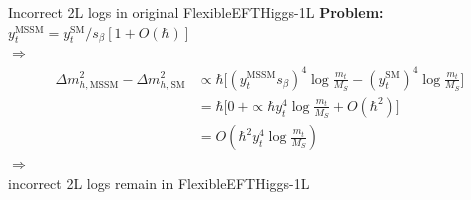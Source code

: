 \documentclass[hyperref={pdfpagelabels=false},ngerman]{beamer}
\renewcommand{\emph}{\textbf}
\newcommand{\SM}{\ensuremath{\text{SM}}}
\newcommand{\MSSM}{\ensuremath{\text{MSSM}}}
\begin{document}
\begin{frame}[noframenumbering]{Incorrect 2L logs in original FlexibleEFTHiggs-1L}
  \emph{Problem:} $y_t^{\MSSM} = y_t^\SM/s_\beta [1 + O(\hbar)] $\\
  $\Rightarrow$
  \begin{align*}
    \Delta m_{h,\MSSM}^2 - \Delta m_{h,\SM}^2 &\propto
    \hbar \Bigg[ (y_t^\MSSM s_\beta)^4 \log\frac{m_t}{M_S} - (y_t^\SM)^4 \log\frac{m_t}{M_S}\Bigg] \\
    &= \hbar \Bigg[0\ + \propto \hbar y_t^4 \log\frac{m_t}{M_S} + O(\hbar^2) \Bigg] \\
    &= O(\hbar^2 y_t^4 \log\frac{m_t}{M_S})
  \end{align*}
  $\Rightarrow$\\
  incorrect 2L logs remain in FlexibleEFTHiggs-1L
\end{frame}
\end{document}
